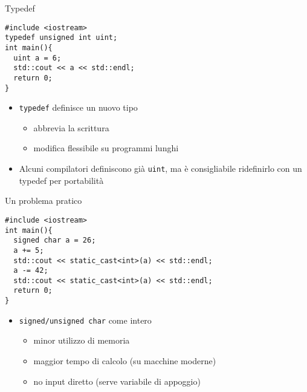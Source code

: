 \begin{frame}[fragile]{Typedef}
  \vfill
  \begin{lstlisting}
#include <iostream>
typedef unsigned int uint;
int main(){
  uint a = 6;
  std::cout << a << std::endl;
  return 0;
}
  \end{lstlisting}
  \vfill
  \begin{itemize}
    \item \lstinline$typedef$ definisce un nuovo tipo
    \begin{itemize}
      \item abbrevia la scrittura
      \item modifica flessibile su programmi lunghi
    \end{itemize}
    \vfill
    \item Alcuni compilatori definiscono già \lstinline$uint$, ma è consigliabile
    ridefinirlo con un typedef per portabilità
  \end{itemize}
  \vfill
\end{frame}

\begin{frame}[fragile]{Un problema pratico}
  \vfill
  \begin{lstlisting}
#include <iostream>
int main(){
  signed char a = 26;
  a += 5;
  std::cout << static_cast<int>(a) << std::endl;
  a -= 42;
  std::cout << static_cast<int>(a) << std::endl;
  return 0;
}
  \end{lstlisting}
  \vfill
  \begin{itemize}
    \item \lstinline$signed/unsigned char$ come intero
    \begin{itemize}
      \item minor utilizzo di memoria
      \item maggior tempo di calcolo (su macchine moderne)
      \item no input diretto (serve variabile di appoggio)
    \end{itemize}
  \end{itemize}
  \vfill
\end{frame}
